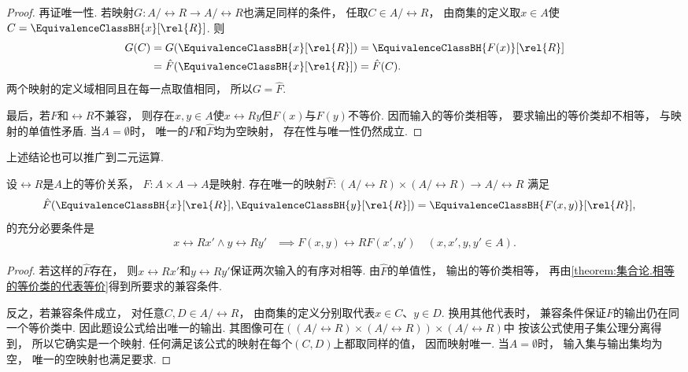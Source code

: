 \begin{theorem}
\begin{proof}
        再证唯一性.
        若映射\(G\colon A/\rel{R}\to A/\rel{R}\)也满足同样的条件，
        任取\(C\in A/\rel{R}\)，
        由商集的定义取\(x\in A\)使\(C=\EquivalenceClassBH{x}[\rel{R}]\).
        则
        \begin{align*}
            G(C)&=G(\EquivalenceClassBH{x}[\rel{R}])
            =\EquivalenceClassBH{F(x)}[\rel{R}]\\
            &=\hat{F}(\EquivalenceClassBH{x}[\rel{R}])=\hat{F}(C).
        \end{align*}
        两个映射的定义域相同且在每一点取值相同，
        所以\(G=\hat{F}\).

        最后，若\(F\)和\(\rel{R}\)不兼容，
        则存在\(x,y\in A\)使\(x\rel{R}y\)但\(F(x)\)与\(F(y)\)不等价.
        因而输入的等价类相等，
        要求输出的等价类却不相等，
        与映射的单值性矛盾.
        当\(A=\emptyset\)时，
        唯一的\(F\)和\(\hat{F}\)均为空映射，
        存在性与唯一性仍然成立.
    \end{proof}
\end{theorem}

上述结论也可以推广到二元运算.
\begin{proposition}
    设\(\rel{R}\)是\(A\)上的等价关系，
    \(F\colon A\times A\to A\)是映射.
    存在唯一的映射\(\hat{F}\colon(A/\rel{R})\times(A/\rel{R})\to A/\rel{R}\)
    满足
    \begin{align*}
        \hat{F}(\EquivalenceClassBH{x}[\rel{R}],\EquivalenceClassBH{y}[\rel{R}])
        &=\EquivalenceClassBH{F(x,y)}[\rel{R}],
    \end{align*}
    的充分必要条件是
    \begin{align*}
        x\rel{R}x'\land y\rel{R}y'
        &\implies F(x,y)\rel{R}F(x',y')
        \quad(x,x',y,y'\in A).
    \end{align*}
    \begin{proof}
        若这样的\(\hat{F}\)存在，
        则\(x\rel{R}x'\)和\(y\rel{R}y'\)保证两次输入的有序对相等.
        由\(\hat{F}\)的单值性，
        输出的等价类相等，
        再由\cref{theorem:集合论.相等的等价类的代表等价}得到所要求的兼容条件.

        反之，若兼容条件成立，
        对任意\(C,D\in A/\rel{R}\)，
        由商集的定义分别取代表\(x\in C\)、\(y\in D\).
        换用其他代表时，
        兼容条件保证\(F\)的输出仍在同一个等价类中.
        因此题设公式给出唯一的输出.
        其图像可在\(((A/\rel{R})\times(A/\rel{R}))\times(A/\rel{R})\)中
        按该公式使用子集公理分离得到，
        所以它确实是一个映射.
        任何满足该公式的映射在每个\((C,D)\)上都取同样的值，
        因而映射唯一.
        当\(A=\emptyset\)时，
        输入集与输出集均为空，
        唯一的空映射也满足要求.
    \end{proof}
\end{proposition}
